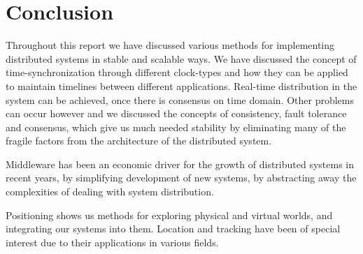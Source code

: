 


\chapter{Conclusion} \label{ch:conclussion}
Throughout this report we have discussed various methods for implementing distributed systems in stable and scalable ways. We have discussed the concept of time-synchronization through different clock-types and how they can be applied to maintain timelines between different applications. Real-time distribution in the system can be achieved, once there is consensus on time domain. Other problems can occur however and we discussed the concepts of consistency, fault tolerance and consensus, which give us much needed stability by eliminating many of the fragile factors from the architecture of the distributed system.

Middleware has been an economic driver for the growth of distributed systems in recent years, by simplifying development of new systems, by abstracting away the complexities of dealing with system distribution.

Positioning shows us methods for exploring physical and virtual worlds, and integrating our systems into them. Location and tracking have been of special interest due to their applications in various fields.

